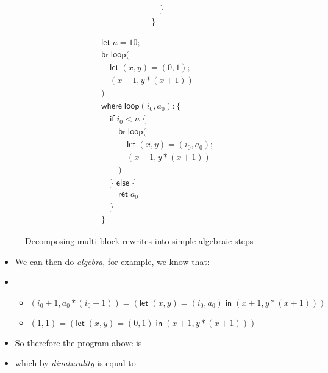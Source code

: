 \documentclass[acmsmall,screen,review]{acmart}
\newcommand{\ms}[1]{\ensuremath{\mathsf{#1}}}
\begin{document}
\begin{figure}
\begin{minipage}{.5\textwidth}
\begin{subfigure}{\textwidth}
\begin{align*}
        & \quad \} \\
        & \}
      \end{align*}
    \end{subfigure}
  \end{minipage}%
  \begin{subfigure}[c]{.5\textwidth}
    \begin{align*}
      & \ms{let}\;n = 10; \\
      & \ms{br}\;\ms{loop}( \\
      & \quad \ms{let}\;(x, y) = (0, 1); \\
      & \quad(x + 1, y * (x + 1)) \\
      & ) \\
      & \ms{where}\;\ms{loop}(i_0, a_0): \{\\
      & \quad \ms{if}\;i_0 < n\;\{ \\
      & \qquad \ms{br}\;\ms{loop}( \\
      & \qquad \quad \ms{let}\;(x, y) = (i_0, a_0); \\
      & \qquad \quad (x + 1, y * (x + 1)) \\ 
      & \qquad ) \\
      & \quad \}\;\ms{else}\;\{ \\
      & \qquad \ms{ret}\;a_0 \\
      & \quad \} \\
      & \}
    \end{align*}
  \end{subfigure}
  \caption{Decomposing multi-block rewrites into simple algebraic steps}
  \Description{}
\end{figure}

\begin{itemize}
  \item We can then do \textit{algebra}, for example, we know that:
  \item \begin{itemize}
    \item $(i_0 + 1, a_0 * (i_0 + 1)) 
      = (\ms{let}\;(x, y) = (i_0, a_0)\;\ms{in}\;(x + 1, y * (x + 1)))$
    \item $(1, 1)
    = (\ms{let}\;(x, y) = (0, 1)\;\ms{in}\;(x + 1, y * (x + 1)))$
  \end{itemize}
  \item So therefore the program above is
\end{itemize}

\begin{itemize}
  \item which by \textit{dinaturality} is equal to
\end{itemize}
\end{document}
